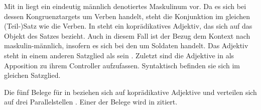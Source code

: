 
Mit   in  liegt ein eindeutig
männlich denotiertes Maskulinum vor. Da es sich bei dessen
Kongruenztargets um Verben handelt, steht die Konjunktion im gleichen
(Teil-)Satz wie die Verben. In  steht ein
koprädikatives Adjektiv, das sich auf das Objekt des
Satzes bezieht. Auch in diesem Fall ist der Bezug dem Kontext nach
maskulin-männlich, insofern es sich bei den 
 um Soldaten handelt. Das Adjektiv steht in einem anderen
Satzglied als sein . Zuletzt sind die Adjektive in
 als Apposition zu ihrem Controller
aufzufassen. Syntaktisch befinden sie sich im gleichen Satzglied.

Die fünf Belege für  in  beziehen sich auf
koprädikative Adjektive und verteilen sich auf drei
Parallelstellen%
. Einer der Belege wird in  zitiert.

